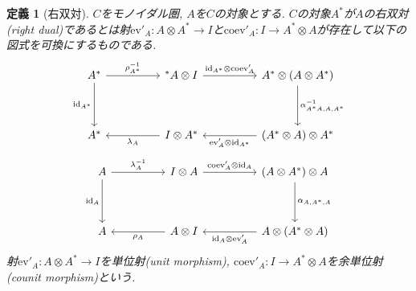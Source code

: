 \documentclass[a4paper,12pt]{ltjsarticle}
\theoremstyle{break}
\newtheorem{defn}[thm]{定義}
\newcommand{\id}{\mathrm{id}}
\newcommand{\eva}{\mathrm{ev}}
\newcommand{\coev}{\mathrm{coev}}
\newcommand{\al}{\alpha}
\newcommand{\la}{\lambda}
\newcommand{\ot}{\otimes}
\numberwithin{equation}{section}
\begin{document}
\begin{defn}[右双対]
  $C$をモノイダル圏, $A$を$C$の対象とする. 
  $C$の対象$A^*$が$A$の右双対(right dual)であるとは射$\eva'_A: A \ot A^* \to I$と$\coev'_A: I \to A^* \ot A$が存在して以下の図式を可換にするものである. 
  \[\begin{tikzcd}
    A^* && {{}^*A \ot I} && {A^* \ot (A \ot A^*)} \\
    \\
    A^* && {I \ot A^*} && {(A^* \ot A) \ot A^*}
    \arrow["{\rho_{A^*}^{-1}}", from=1-1, to=1-3]
    \arrow["{\id_{A^*} \ot \coev'_A}", from=1-3, to=1-5]
    \arrow["{\id_{A^*}}"', from=1-1, to=3-1]
    \arrow["{\la_A}", from=3-3, to=3-1]
    \arrow["{\eva'_A \ot \id_{A^*}}", from=3-5, to=3-3]
    \arrow["{\al_{A^*A,A,A^*}^{-1}}", from=1-5, to=3-5]
  \end{tikzcd}\]
  \[\begin{tikzcd}
    A && {I \ot A} && {(A \ot A^*) \ot A} \\
    \\
    A && {A \ot I} && {A \ot (A^* \ot A)}
    \arrow["{\la_A^{-1}}", from=1-1, to=1-3]
    \arrow["{\coev'_A \ot \id_A}", from=1-3, to=1-5]
    \arrow["{\id_A}"', from=1-1, to=3-1]
    \arrow["{\rho_A}", from=3-3, to=3-1]
    \arrow["{\id_A \ot \eva'_A}", from=3-5, to=3-3]
    \arrow["{\al_{A,A^*,A}}", from=1-5, to=3-5]
  \end{tikzcd}\]
  射$\eva'_A: A \ot A^* \to I$を単位射(unit morphism), $\coev'_A: I \to A^* \ot A$を余単位射(counit morphism)という. 
\end{defn}
\end{document}

